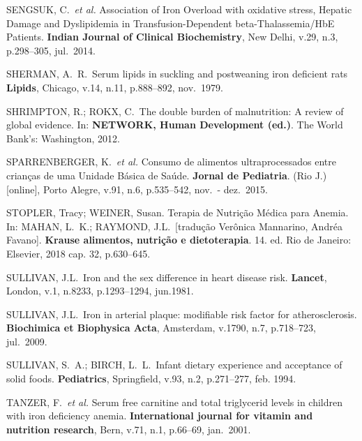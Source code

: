 \bigbreak

\noindent SENGSUK, C.\ \textit{et al.} Association of Iron Overload with oxidative stress, Hepatic Damage and Dyslipidemia in Transfusion-Dependent beta-Thalassemia/HbE Patients. \textbf{Indian Journal of Clinical Biochemistry}, New Delhi, v.29, n.3, p.298--305, jul.\ 2014.

\bigbreak

\noindent SHERMAN, A.\ R.\ Serum lipids in suckling and postweaning iron deficient rats \textbf{Lipids}, Chicago, v.14, n.11, p.888--892, nov.\ 1979.

\bigbreak

\noindent SHRIMPTON, R.; ROKX, C.\ The double burden of malnutrition: A review of global evidence. In: \textbf{NETWORK, Human Development (ed.)}. The World Bank’s: Washington, 2012.

\bigbreak

\noindent SPARRENBERGER, K.\ \textit{et al.} Consumo de alimentos ultraprocessados entre crianças de uma Unidade Básica de Saúde. \textbf{Jornal de Pediatria}. (Rio J.) [online], Porto Alegre, v.91, n.6, p.535--542, nov.\ - dez.\ 2015.

\bigbreak

\noindent STOPLER, Tracy; WEINER, Susan. Terapia de Nutrição Médica para Anemia. In: MAHAN, L.\ K.; RAYMOND, J.L.\ [tradução Verônica Mannarino, Andréa Favano]. \textbf{Krause alimentos, nutrição e dietoterapia}. 14. ed. Rio de Janeiro: Elsevier, 2018 cap. 32, p.630--645.

\bigbreak

\noindent SULLIVAN, J.L.\ Iron and the sex difference in heart disease risk. \textbf{Lancet}, London, v.1, n.8233, p.1293--1294, jun.1981.

\bigbreak

\noindent SULLIVAN, J.L.\ Iron in arterial plaque: modifiable risk factor for atherosclerosis. \textbf{Biochimica et Biophysica Acta}, Amsterdam, v.1790, n.7, p.718--723, jul.\ 2009.

\bigbreak

\noindent SULLIVAN, S.\ A.; BIRCH, L.\ L.\ Infant dietary experience and acceptance of solid foods. \textbf{Pediatrics}, Springfield, v.93, n.2, p.271--277, feb. 1994. 

\bigbreak

\noindent TANZER, F.\ \textit{et al.} Serum free carnitine and total triglycerid levels in children with iron deficiency anemia. \textbf{International journal for vitamin and nutrition research}, Bern, v.71, n.1, p.66–69, jan.\ 2001.

